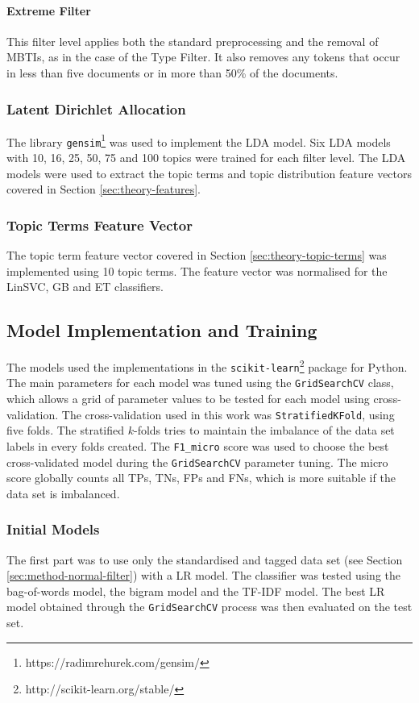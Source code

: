 \paragraph{Extreme Filter} \label{sec:method-extreme-filter}
This filter level applies both the standard preprocessing and the removal of MBTIs, as in the case of the Type Filter.
It also removes any tokens that occur in less than five documents or in more than 50\% of the documents.

\subsubsection{Latent Dirichlet Allocation}
The library \texttt{gensim}\footnote{https://radimrehurek.com/gensim/} was used to implement the LDA model.
Six LDA models with 10, 16, 25, 50, 75 and 100 topics were trained for each filter level.
The LDA models were used to extract the topic terms and topic distribution feature vectors covered in Section \ref{sec:theory-features}.


\subsubsection{Topic Terms Feature Vector}
The topic term feature vector covered in Section \ref{sec:theory-topic-terms} was implemented using 10 topic terms.
The feature vector was normalised for the LinSVC, GB and ET classifiers.


\subsection{Model Implementation and Training}
The models used the implementations in the \texttt{scikit-learn}\footnote{http://scikit-learn.org/stable/} package for Python.
The main parameters for each model was tuned using the \texttt{GridSearchCV} class, which allows a grid of parameter values to be tested for each model using cross-validation. 
The cross-validation used in this work was \texttt{StratifiedKFold}, using five folds.
The stratified $k$-folds tries to maintain the imbalance of the data set labels in every folds created. 
The \texttt{F1\_micro} score was used to choose the best cross-validated model during the \texttt{GridSearchCV} parameter tuning.
The micro score globally counts all TPs, TNs, FPs and FNs, which is more suitable if the data set is imbalanced. 

\subsubsection{Initial Models} \label{sec:method-initial-models}
The first part was to use only the standardised and tagged data set (see Section \ref{sec:method-normal-filter}) with a LR model.
The classifier was tested using the bag-of-words model, the bigram model and the TF-IDF model.
The best LR model obtained through the \texttt{GridSearchCV} process was then evaluated on the test set.

